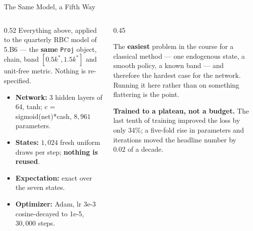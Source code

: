 \begin{frame}{The Same Model, a Fifth Way}
\begin{columns}[T]
\begin{column}{0.52\textwidth}
\small
Everything above, applied to the quarterly RBC model of 5.B6 --- the \textbf{same} \texttt{Proj} object, chain, band $[0.5k^{*},1.5k^{*}]$ and unit-free metric. Nothing is re-specified.
\smallskip
\begin{itemize}\small\setlength{\itemsep}{1mm}
  \item \textbf{Network:} 3 hidden layers of 64, tanh; c = sigmoid(net)*cash, $8{,}961$ parameters.
  \item \textbf{States:} $1{,}024$ fresh uniform draws per step; \textbf{nothing is reused}.
  \item \textbf{Expectation:} exact over the seven states.
  \item \textbf{Optimizer:} Adam, lr 3e-3 cosine-decayed to 1e-5, $30{,}000$ steps.
\end{itemize}
\end{column}
\begin{column}{0.45\textwidth}
\begin{conceptbox}[title=\textbf{What is being tested}]\small
The \textbf{easiest} problem in the course for a classical method --- one endogenous state, a smooth policy, a known band --- and therefore the hardest case for the network. Running it here rather than on something flattering is the point.
\end{conceptbox}
\smallskip
\begin{cautionbox}\footnotesize
\textbf{Trained to a plateau, not a budget.} The last tenth of training improved the loss by only 34\%; a five-fold rise in parameters and iterations moved the headline number by $0.02$ of a decade.
\end{cautionbox}
\end{column}
\end{columns}
\vspace{1mm}
\end{frame}

